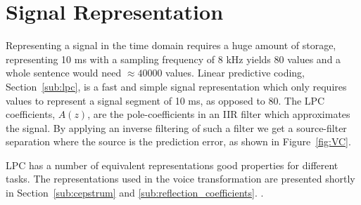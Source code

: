 
\section{Signal Representation} %
\label{the:signal_representation}
Representing a signal in the time domain requires a huge amount of storage, \eg representing 10 ms with a sampling frequency of 8 kHz yields 80 values and a whole sentence would need $\approx 40 000$ values. Linear predictive coding, Section~\ref{sub:lpc}, is a fast and simple signal representation which only requires  values to represent a signal segment of 10 ms, as opposed to 80. The LPC coefficients, $A(z)$, are the pole-coefficients in an IIR filter which approximates the signal. By applying an inverse filtering of such a filter we get a source-filter separation where the source is the prediction error, as shown in Figure~\ref{fig:VC}.

LPC has a number of equivalent representations good properties for different tasks. The representations used in the voice transformation are presented shortly in Section~\ref{sub:cepstrum} and \ref{sub:reflection_coefficients}.
.


